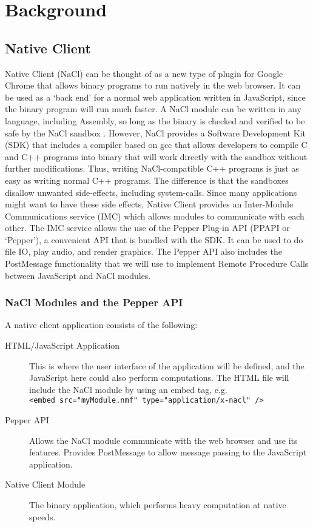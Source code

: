\chapter{Background}

\label{Chapter2} 


\section{Native Client}
Native Client (NaCl) can be thought of as a new type of plugin for Google 
Chrome that allows binary programs to run natively in the web browser. It can 
be used as a `back end' for a normal web application written in JavaScript, 
since the binary program will run much faster. A NaCl module can be written in 
any language, including Assembly, so long as the binary is checked and verified 
to be safe by the NaCl sandbox \cite{nacl}. However, NaCl provides a Software 
Development Kit (SDK) that includes a compiler based on gcc that allows 
developers to compile C and C++ programs into binary that will work directly 
with the sandbox without further modifications. Thus, writing NaCl-compatible 
C++ programs is just as easy as writing normal C++ programs. The difference is 
that the sandboxes disallow unwanted side-effects, including system-calls. 
Since many applications might want to have these side effects, Native Client 
provides an Inter-Module Communications service (IMC) which allows modules to 
communicate with each other. The IMC service allows the use of the Pepper 
Plug-in API (PPAPI or `Pepper'), a convenient API that is bundled with the SDK. 
It can be used to do file IO, play audio, and render graphics. The Pepper API 
also includes the PostMessage functionality that we will use to implement 
Remote Procedure Calls between JavaScript and NaCl modules.

\subsection{NaCl Modules and the Pepper API}
A native client application consists of the following\cite{nacloverview}:
\begin{description}
  \item[HTML/JavaScript Application] 
  This is where the user interface of the application will be defined, and the 
  JavaScript here could also perform computations. The HTML file will include 
  the NaCl module by using an embed tag, e.g. \\
   \verb+<embed src="myModule.nmf" type="application/x-nacl" />+
  \item[Pepper API] 
  Allows the NaCl module communicate with the web browser and use its features. 
  Provides PostMessage to allow message passing to the JavaScript application.
  \item[Native Client Module] 
  The binary application, which performs heavy computation at native speeds.
\end{description}

